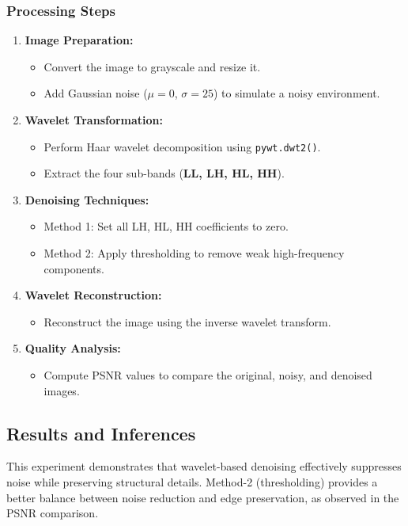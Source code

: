 \documentclass[12pt,a4paper]{article}
\begin{document}
\subsubsection{Processing Steps}
\begin{enumerate}
  \item \textbf{Image Preparation:}
    \begin{itemize}
      \item Convert the image to grayscale and resize it.
      \item Add Gaussian noise (\(\mu = 0\), \(\sigma = 25\)) to simulate a noisy environment.
    \end{itemize}

  \item \textbf{Wavelet Transformation:}
    \begin{itemize}
      \item Perform Haar wavelet decomposition using \texttt{pywt.dwt2()}.
      \item Extract the four sub-bands (\textbf{LL, LH, HL, HH}).
    \end{itemize}

  \item \textbf{Denoising Techniques:}
    \begin{itemize}
      \item Method 1: Set all LH, HL, HH coefficients to zero.
      \item Method 2: Apply thresholding to remove weak high-frequency components.
    \end{itemize}

  \item \textbf{Wavelet Reconstruction:}
    \begin{itemize}
      \item Reconstruct the image using the inverse wavelet transform.
    \end{itemize}

  \item \textbf{Quality Analysis:}
    \begin{itemize}
      \item Compute PSNR values to compare the original, noisy, and denoised images.
    \end{itemize}
\end{enumerate}

\subsection{Results and Inferences}
This experiment demonstrates that wavelet-based denoising effectively suppresses noise while preserving structural details. Method-2 (thresholding) provides a better balance between noise reduction and edge preservation, as observed in the PSNR comparison.
\end{document}

